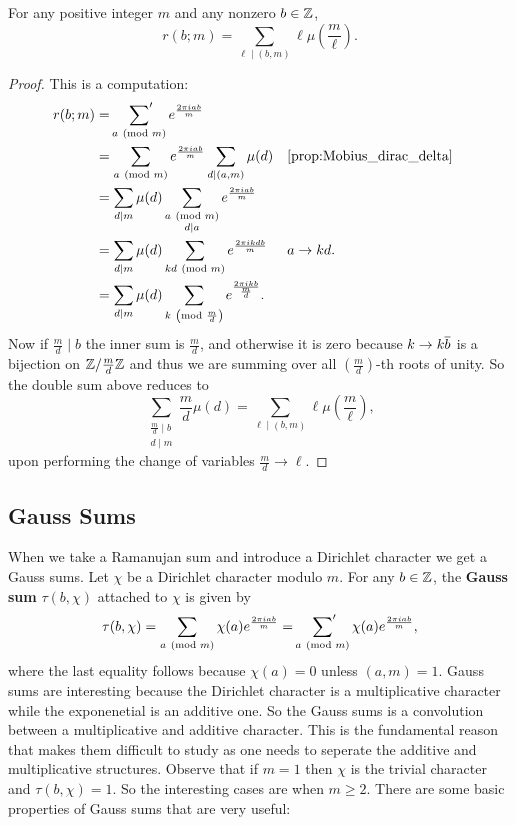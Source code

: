         \begin{proposition}\label{prop:Ramanujan_sum_evaluation}
          For any positive integer $m$ and any nonzero $b \in \mathbb{Z}$,
          \[
            r(b;m) = \sum_{\ell \mid (b,m)}\ell\mu\left(\frac{m}{\ell}\right).
          \]
        \end{proposition}
        \begin{proof}
          This is a computation:
          \begin{align*}
            r(b;m) &= \psum_{a \tmod{m}}e^{\frac{2\pi iab}{m}} \\
            &= \sum_{a \tmod{m}}e^{\frac{2\pi iab}{m}}\sum_{d \mid (a,m)}\mu(d) && \text{\cref{prop:Mobius_dirac_delta}} \\
            &= \sum_{d \mid m}\mu(d)\sum_{\substack{a \tmod{m} \\ d \mid a}}e^{\frac{2\pi iab}{m}} \\
            &= \sum_{d \mid m}\mu(d)\sum_{kd \tmod{m}}e^{\frac{2\pi ikdb}{m}} && \text{$a \to kd$.} \\
            &= \sum_{d \mid m}\mu(d)\sum_{k \tmod{\frac{m}{d}}}e^{\frac{2\pi ik b}{\frac{m}{d}}}.
          \end{align*}
          Now if $\frac{m}{d} \mid b$ the inner sum is $\frac{m}{d}$, and otherwise it is zero because $k \to k\overline{b}$ is a bijection on $\mathbb{Z}/\frac{m}{d}\mathbb{Z}$ and thus we are summing over all $\left(\frac{m}{d}\right)$-th roots of unity. So the double sum above reduces to
          \[
            \sum_{\substack{\frac{m}{d} \mid b \\ d \mid m}}\frac{m}{d}\mu(d) = \sum_{\ell \mid (b,m)}\ell\mu\left(\frac{m}{\ell}\right),
          \]
          upon performing the change of variables $\frac{m}{d} \to \ell$.
        \end{proof}
      \subsection*{Gauss Sums}
        When we take a Ramanujan sum and introduce a Dirichlet character we get a Gauss sums. Let $\chi$ be a Dirichlet character modulo $m$. For any $b \in \mathbb{Z}$, the \textbf{Gauss sum} $\tau(b,\chi)$ attached to $\chi$ is given by
        \[
          \tau(b,\chi) = \sum_{a \ \left(\text{mod }m\right)}\chi(a)e^{\frac{2\pi iab}{m}} = \sideset{}{'}\sum_{a \ \left(\text{mod }m\right)}\chi(a)e^{\frac{2\pi iab}{m}},
        \]
        where the last equality follows because $\chi(a) = 0$ unless $(a,m) = 1$. Gauss sums are interesting because the Dirichlet character is a multiplicative character while the exponenetial is an additive one. So the Gauss sums is a convolution between a multiplicative and additive character. This is the fundamental reason that makes them difficult to study as one needs to seperate the additive and multiplicative structures. Observe that if $m = 1$ then $\chi$ is the trivial character and $\tau(b,\chi) = 1$. So the interesting cases are when $m \ge 2$. There are some basic properties of Gauss sums that are very useful:

